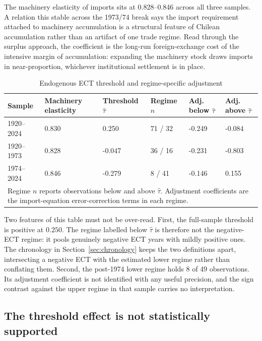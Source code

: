 \documentclass[11pt]{article}
\begin{document}
The machinery elasticity of imports sits at 0.828--0.846 across all three samples. A relation this stable across the 1973/74 break says the import requirement attached to machinery accumulation is a structural feature of Chilean accumulation rather than an artifact of one trade regime. Read through the surplus approach, the coefficient is the long-run foreign-exchange cost of the intensive margin of accumulation: expanding the machinery stock draws imports in near-proportion, whichever institutional settlement is in place.

\begin{table}[H]
\centering
\caption{Endogenous ECT threshold and regime-specific adjustment}
\label{tab:threshold}
\begin{tabular}{p{2.3cm}p{2.4cm}p{2.0cm}p{2.4cm}p{2.4cm}p{2.4cm}}
\toprule
\textbf{Sample} & \textbf{Machinery elasticity} & \textbf{Threshold} $\hat{\tau}$ & \textbf{Regime} $n$ & \textbf{Adj. below} $\hat{\tau}$ & \textbf{Adj. above} $\hat{\tau}$ \\
\midrule
1920--2024 & 0.830 & 0.250 & 71 / 32 & -0.249 & -0.084 \\
1920--1973 & 0.828 & -0.047 & 36 / 16 & -0.231 & -0.803 \\
1974--2024 & 0.846 & -0.279 & 8 / 41 & -0.146 & 0.155 \\
\bottomrule
\multicolumn{6}{p{15.5cm}}{\footnotesize Regime $n$ reports observations below and above $\hat{\tau}$. Adjustment coefficients are the import-equation error-correction terms in each regime.} \\
\end{tabular}
\end{table}

Two features of this table must not be over-read. First, the full-sample threshold is positive at $0.250$. The regime labelled below $\hat{\tau}$ is therefore not the negative-ECT regime: it pools genuinely negative ECT years with mildly positive ones. The chronology in Section~\ref{sec:chronology} keeps the two definitions apart, intersecting a negative ECT with the estimated lower regime rather than conflating them. Second, the post-1974 lower regime holds 8 of 49 observations. Its adjustment coefficient is not identified with any useful precision, and the sign contrast against the upper regime in that sample carries no interpretation.

\FloatBarrier
\subsection{The threshold effect is not statistically supported}
\end{document}
